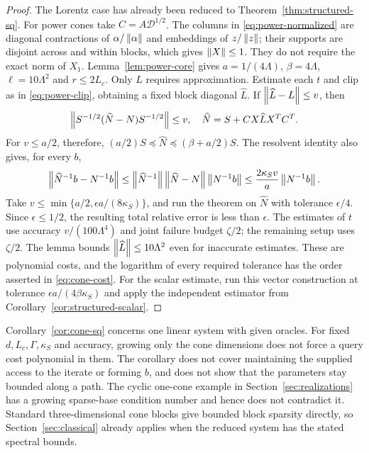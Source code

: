 \begin{proof}
The Lorentz case has already been reduced to
Theorem~\ref{thm:structured-sq}. For power cones take $C=A\mathcal D^{1/2}$.
The columns in \eqref{eq:power-normalized} are diagonal contractions of
$\alpha/\left\lVert\alpha\right\rVert$ and embeddings of $z/\left\lVert z\right\rVert$; their supports are
disjoint across and within blocks, which gives $\left\lVert X\right\rVert\leq1$. They do not
require the exact norm of $X_1$. Lemma~\ref{lem:power-core} gives
$a=1/(4\Lambda)$, $\beta=4\Lambda$, $\ell=10\Lambda^2$ and $r\leq2L_c$.
Only $L$ requires approximation. Estimate each $t$ and clip as in
\eqref{eq:power-clip}, obtaining a fixed block diagonal $\widehat L$.
If $\left\lVert\widehat L-L\right\rVert\leq v$, then
\[
 \left\lVert S^{-1/2}(\widehat N-N)S^{-1/2}\right\rVert\leq v,
 \quad \widehat N=S+CX\widehat L X^TC^T.
\]
For $v\leq a/2$, therefore,
$(a/2)S\preceq\widehat N\preceq(\beta+a/2)S$. The resolvent identity
also gives, for every $b$,
\[
 \left\lVert\widehat N^{-1}b-N^{-1}b\right\rVert
 \leq\left\lVert\widehat N^{-1}\right\rVert\left\lVert\widehat N-N\right\rVert\left\lVert N^{-1}b\right\rVert
 \leq\frac{2\kappa_S v}{a}\left\lVert N^{-1}b\right\rVert.
\]
Take $v\leq\min\{a/2,\epsilon a/(8\kappa_S)\}$, and run the theorem
on $\widehat N$ with tolerance $\epsilon/4$. Since $\epsilon\leq1/2$,
the resulting total relative error is less than $\epsilon$.
The estimates of $t$ use accuracy $v/(100\Lambda^4)$ and joint failure
budget $\zeta/2$; the remaining setup uses $\zeta/2$. The lemma bounds
$\left\lVert\widehat L\right\rVert\leq10\Lambda^2$ even for inaccurate estimates.
These are polynomial costs, and the logarithm of every required tolerance
has the order asserted in \eqref{eq:cone-cost}. For the scalar estimate,
run this vector construction at tolerance
$\epsilon a/(4\beta\kappa_S)$ and apply the independent estimator from
Corollary~\ref{cor:structured-scalar}.
\end{proof}

Corollary~\ref{cor:cone-sq} concerns one linear system with given oracles.
For fixed $d,L_c,\Gamma,\kappa_S$ and accuracy, growing only the cone
dimensions does not force a query cost polynomial in them. The corollary
does not cover maintaining the supplied access to the iterate or forming
$b$, and does not show that the parameters stay bounded along a path. The
cyclic one-cone example in Section~\ref{sec:realizations} has a growing
sparse-base condition number and hence does not contradict it. Standard
three-dimensional cone blocks give bounded block sparsity directly, so
Section~\ref{sec:classical} already applies when the reduced system has
the stated spectral bounds.

